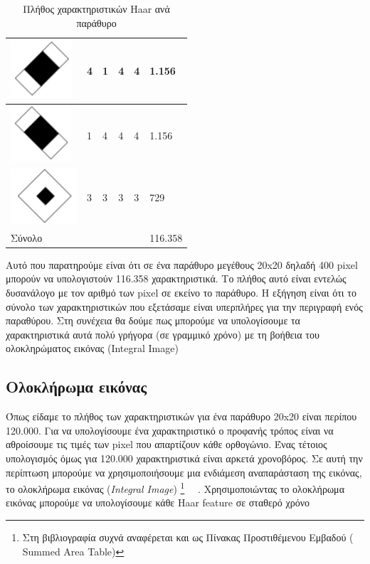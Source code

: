 \begin{table}[htbp]
\begin{tabular}{ | l | l | l | l | l | l | }
    \hline
        \hspace{16pt}\includegraphics[width=0.4\maxwidth]{../figures/h13.png}
        & 4 & 1 & 4 & 4 & 1.156 \\
    \hline
        \hspace{16pt}\includegraphics[width=0.4\maxwidth]{../figures/h14.png}
        & 1 & 4 & 4 & 4 & 1.156 \\
    \hline
        \hspace{16pt}\includegraphics[width=0.4\maxwidth]{../figures/h15.png}
        & 3 & 3 & 3 & 3 & 729 \\
    \hline
        Σύνολο & & & & &116.358 \\
    \hline
  \end{tabular}
  \caption{Πλήθος χαρακτηριστικών Haar ανά παράθυρο}
  \label{tab:haarsum}
\end{table}

Αυτό που παρατηρούμε είναι ότι σε ένα παράθυρο μεγέθους 20x20 δηλαδή 400 pixel
μπορούν να υπολογιστούν 116.358 χαρακτηριστικά. Το πλήθος αυτό είναι
εντελώς δυσανάλογο με τον αριθμό των pixel σε εκείνο το παράθυρο.
Η εξήγηση είναι ότι το σύνολο των χαρακτηριστικών που εξετάσαμε είναι υπερπλήρες
για την περιγραφή ενός παραθύρου.
Στη συνέχεια θα δούμε πως μπορούμε να υπολογίσουμε τα χαρακτηριστικά αυτά
πολύ γρήγορα (σε γραμμικό χρόνο) με τη βοήθεια του ολοκληρώματος εικόνας (Integral Image)

\subsection{Ολοκλήρωμα εικόνας}

Όπως είδαμε το πλήθος των χαρακτηριστικών για ένα παράθυρο 20x20 είναι περίπου 120.000.
Για να υπολογίσουμε ένα χαρακτηριστικό ο προφανής τρόπος είναι να αθροίσουμε τις
τιμές των pixel που απαρτίζουν κάθε ορθογώνιο. Ένας τέτοιος υπολογισμός όμως για 120.000
χαρακτηριστικά είναι αρκετά χρονοβόρος. Σε αυτή την περίπτωση μπορούμε να χρησιμοποιήσουμε
μια ενδιάμεση αναπαράσταση της εικόνας, το ολοκλήρωμα εικόνας (\emph{Integral Image})
\footnote{Στη βιβλιογραφία συχνά αναφέρεται και ως Πίνακας Προστιθέμενου Εμβαδού (
Summed Area Table)}
~\cite{Lienhart02anextended}~\cite{Lienhart2003}.
Χρησιμοποιώντας το ολοκλήρωμα εικόνας μπορούμε να υπολογίσουμε κάθε Haar feature
σε σταθερό χρόνο

